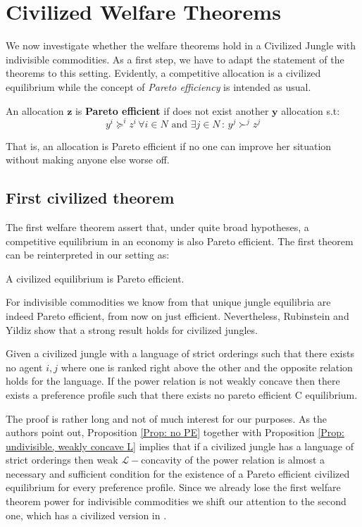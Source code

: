 \section{Civilized Welfare Theorems}

We now investigate whether the welfare theorems hold in a Civilized Jungle with indivisible commodities. As a first step, we have to adapt the statement of the theorems to this setting. Evidently, a competitive allocation is a civilized equilibrium while the concept of \textit{Pareto efficiency} is intended as usual.

\begin{definition}
    An allocation $\textbf{z}$ is \textbf{Pareto efficient} if does not exist another $\textbf{y}$ allocation s.t:
    \[y^i\succeq^iz^i\,\forall i\in N \text{ and } \exists j\in N \,: \,y^j\succ^jz^j \]
\end{definition}

That is, an allocation is Pareto efficient if no one can improve her situation without making anyone else worse off. 

\subsection{First civilized theorem}

The first welfare theorem assert that, under quite broad hypotheses, a competitive equilibrium in an economy is also Pareto efficient. The first theorem can be reinterpreted in our setting as:

\begin{center}
    A civilized equilibrium is Pareto efficient.
\end{center}

For indivisible commodities we know from \cite*[PR]{P-R} that unique jungle equilibria are indeed Pareto efficient, from now on just efficient. Nevertheless, Rubinstein and Yildiz \cite[RY]{RY} show that a strong result holds for civilized jungles.

\begin{proposition}\label{Prop: no PE}
    Given a civilized jungle with a language of strict orderings such that there exists no agent $i,j$ where one is ranked right above the other and the opposite relation holds for the language. If the power relation is not weakly concave then there exists a preference profile such that there exists no pareto efficient C equilibrium. 
\end{proposition}

The proof is rather long and not of much interest for our purposes. As the authors point out, Proposition \ref{Prop: no PE} together with Proposition \ref{Prop: undivisible, weakly concave L} implies that if a civilized jungle has a language of strict orderings then weak $\mathcal{L}-$concavity of the power relation is almost a necessary and sufficient condition for the existence of a Pareto efficient civilized equilibrium for every preference profile.  
Since we already lose the first welfare theorem power for indivisible commodities we shift our attention to the second one, which has a civilized version in \cite[RY]{RY}.

